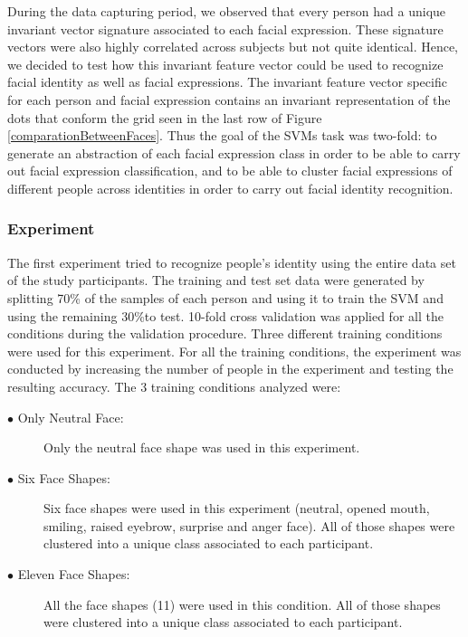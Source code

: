 \documentclass[]{article}
\begin{document}
During the data capturing period, we observed that every person had a unique invariant vector signature associated to
each facial expression. These signature vectors were also highly correlated across subjects but not quite identical.
Hence, we decided to test how this invariant feature vector could be used to recognize facial identity as well as facial
expressions. The invariant feature vector specific for each person and facial expression contains an invariant
representation of the dots that conform the grid seen in the last row of Figure
\ref{comparationBetweenFaces}. Thus the goal of the SVMs task was two-fold: to generate an abstraction of each facial
expression class in order to be able to carry out facial expression classification, and to be able to cluster facial
expressions of different people across identities in order to carry out facial identity recognition.


\subsubsection{Experiment}\label{experimentsSubsection}
The first experiment tried to recognize people's identity using the entire data set of the study participants. The
training and test set data were generated by splitting 70\% of the samples of each person and using it to train the SVM
and using the remaining 30\%to test. 10-fold cross validation was applied for all the conditions during the validation
procedure. Three different training conditions were used for this experiment. For all the training conditions, the
experiment was conducted by increasing the number of people in the experiment and testing the resulting accuracy. The 3
training conditions analyzed were:

\begin{description}
	\item[$\bullet$ Only Neutral Face:] Only the neutral face shape was used in this
	experiment.   
	\item[$\bullet$ Six Face Shapes:] Six face shapes were used in this experiment (neutral,
	opened mouth, smiling, raised eyebrow, surprise and anger face). All of those
	shapes were clustered into a unique class associated to each
	participant. 
	\item[$\bullet$ Eleven Face Shapes:] All the face shapes (11) were used in this condition. All of those
	shapes were clustered into a unique class associated to each participant. 
\end{description}
\end{document}
